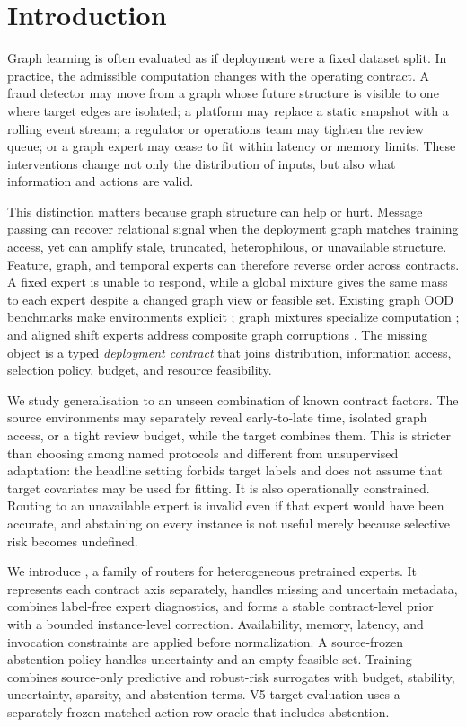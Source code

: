 \section{Introduction}

Graph learning is often evaluated as if deployment were a fixed dataset split. In practice, the admissible computation changes with the operating contract. A fraud detector may move from a graph whose future structure is visible to one where target edges are isolated; a platform may replace a static snapshot with a rolling event stream; a regulator or operations team may tighten the review queue; or a graph expert may cease to fit within latency or memory limits. These interventions change not only the distribution of inputs, but also what information and actions are valid.

This distinction matters because graph structure can help or hurt. Message passing can recover relational signal when the deployment graph matches training access, yet can amplify stale, truncated, heterophilous, or unavailable structure. Feature, graph, and temporal experts can therefore reverse order across contracts. A fixed expert is unable to respond, while a global mixture gives the same mass to each expert despite a changed graph view or feasible set. Existing graph OOD benchmarks make environments explicit \cite{gui2022good}; graph mixtures specialize computation \cite{wang2023gmoe,zeng2024mowst}; and aligned shift experts address composite graph corruptions \cite{wu2024graphmetro}. The missing object is a typed \emph{deployment contract} that joins distribution, information access, selection policy, budget, and resource feasibility.

We study generalisation to an unseen combination of known contract factors. The source environments may separately reveal early-to-late time, isolated graph access, or a tight review budget, while the target combines them. This is stricter than choosing among named protocols and different from unsupervised adaptation: the headline setting forbids target labels and does not assume that target covariates may be used for fitting. It is also operationally constrained. Routing to an unavailable expert is invalid even if that expert would have been accurate, and abstaining on every instance is not useful merely because selective risk becomes undefined.

We introduce \method{}, a family of routers for heterogeneous pretrained experts. It represents each contract axis separately, handles missing and uncertain metadata, combines label-free expert diagnostics, and forms a stable contract-level prior with a bounded instance-level correction. Availability, memory, latency, and invocation constraints are applied before normalization. A source-frozen abstention policy handles uncertainty and an empty feasible set. Training combines source-only predictive and robust-risk surrogates with budget, stability, uncertainty, sparsity, and abstention terms. V5 target evaluation uses a separately frozen matched-action row oracle that includes abstention.

